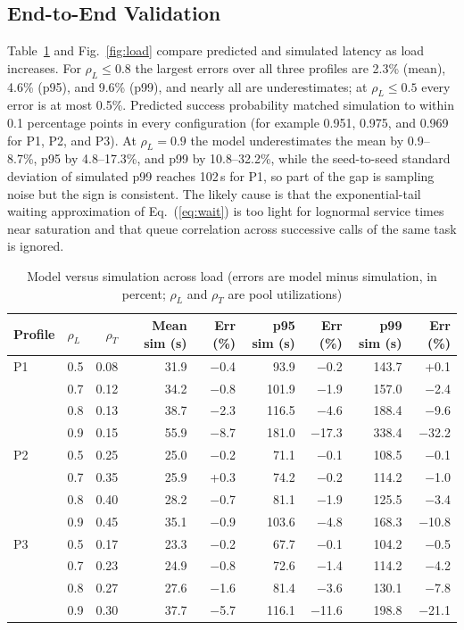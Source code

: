 \documentclass[journal]{IEEEtran}
\begin{document}
\subsection{End-to-End Validation}
Table~\ref{tab:valid} and Fig.~\ref{fig:load} compare predicted and simulated latency as load increases. For $\rho_L\le0.8$ the largest errors over all three profiles are 2.3\% (mean), 4.6\% (p95), and 9.6\% (p99), and nearly all are underestimates; at $\rho_L\le0.5$ every error is at most 0.5\%. Predicted success probability matched simulation to within 0.1 percentage points in every configuration (for example 0.951, 0.975, and 0.969 for P1, P2, and P3). At $\rho_L=0.9$ the model underestimates the mean by 0.9--8.7\%, p95 by 4.8--17.3\%, and p99 by 10.8--32.2\%, while the seed-to-seed standard deviation of simulated p99 reaches 102\,s for P1, so part of the gap is sampling noise but the sign is consistent. The likely cause is that the exponential-tail waiting approximation of Eq.~(\ref{eq:wait}) is too light for lognormal service times near saturation and that queue correlation across successive calls of the same task is ignored.
\begin{table}[t]
\caption{Model versus simulation across load (errors are model minus simulation, in percent; $\rho_L$ and $\rho_T$ are pool utilizations)}
\label{tab:valid}
\centering
\footnotesize
\begin{tabular}{llrrrrrrr}
\toprule
Profile & $\rho_L$ & $\rho_T$ & Mean sim (s) & Err (\%) & p95 sim (s) & Err (\%) & p99 sim (s) & Err (\%) \\
\midrule
P1 & 0.5 & 0.08 & 31.9 & $-$0.4 & 93.9 & $-$0.2 & 143.7 & +0.1 \\
 & 0.7 & 0.12 & 34.2 & $-$0.8 & 101.9 & $-$1.9 & 157.0 & $-$2.4 \\
 & 0.8 & 0.13 & 38.7 & $-$2.3 & 116.5 & $-$4.6 & 188.4 & $-$9.6 \\
 & 0.9 & 0.15 & 55.9 & $-$8.7 & 181.0 & $-$17.3 & 338.4 & $-$32.2 \\
\midrule
P2 & 0.5 & 0.25 & 25.0 & $-$0.2 & 71.1 & $-$0.1 & 108.5 & $-$0.1 \\
 & 0.7 & 0.35 & 25.9 & +0.3 & 74.2 & $-$0.2 & 114.2 & $-$1.0 \\
 & 0.8 & 0.40 & 28.2 & $-$0.7 & 81.1 & $-$1.9 & 125.5 & $-$3.4 \\
 & 0.9 & 0.45 & 35.1 & $-$0.9 & 103.6 & $-$4.8 & 168.3 & $-$10.8 \\
\midrule
P3 & 0.5 & 0.17 & 23.3 & $-$0.2 & 67.7 & $-$0.1 & 104.2 & $-$0.5 \\
 & 0.7 & 0.23 & 24.9 & $-$0.8 & 72.6 & $-$1.4 & 114.2 & $-$4.2 \\
 & 0.8 & 0.27 & 27.6 & $-$1.6 & 81.4 & $-$3.6 & 130.1 & $-$7.8 \\
 & 0.9 & 0.30 & 37.7 & $-$5.7 & 116.1 & $-$11.6 & 198.8 & $-$21.1 \\
\bottomrule
\end{tabular}
\end{table}
\end{document}

